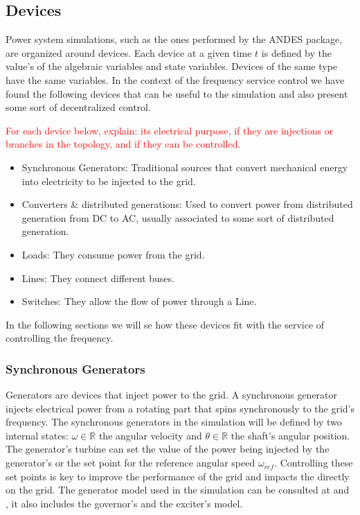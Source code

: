 \documentclass{article}
\begin{document}
\subsection{Devices}

Power system simulations, such as the ones performed by the ANDES package, are organized around devices. Each device at a given time $t$ is defined by the value's of the algebraic variables and state variables. Devices of the same type have the same variables. In the context of the frequency service control we have found the following devices that can be useful to the simulation and also present some sort of decentralized control.

\textcolor{red}{For each device below, explain: its electrical purpose, if they are injections or branches in the topology, and if they can be controlled.}
\begin{itemize}
    \item Synchronous Generators: Traditional sources that convert mechanical energy into electricity to be injected to the grid.
    \item Converters \& distributed generations: Used to convert power from distributed generation from DC to AC, usually associated to some sort of distributed generation.
    \item Loads: They consume power from the grid.
    \item Lines: They connect different buses.
    \item Switches: They allow the flow of power through a Line.
\end{itemize}

In the following sections we will se how these devices fit with the service of controlling the frequency.

\subsubsection*{Synchronous Generators}

Generators are devices that inject power to the grid. A synchronous generator injects electrical power from a rotating part that spins synchronously to the grid's frequency. The synchronous generators in the simulation will be defined by two internal states: $\omega \in \mathbb{R}$ the angular velocity and $\theta  \in \mathbb{R}$ the shaft's angular position. The generator's turbine can set the value of the power being injected by the generator's or the set point for the reference angular speed $\omega_{ref}$. Controlling these set points is key to improve the performance of the grid and impacts the directly on the grid. The generator model used in the simulation can be consulted at \cite{image:diagram:governor} and \cite{source:andes:models:generator}, it also includes the governor's and the exciter's model.
\end{document}
